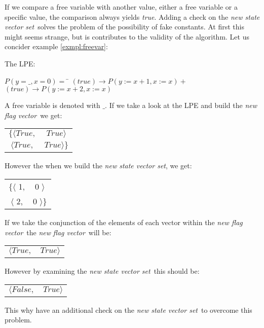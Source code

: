 \documentclass[a4paper,10pt]{article}
\theoremstyle{plain}
\theoremstyle{definition}
\newcommand{\ti}{\textit}
\newcommand{\fv}{\textit{flag vector}}
\newcommand{\svs}{\textit{new state vector set}}
\newcommand{\nfv}{\textit{new flag vector}}
\begin{document}
If we compare a free variable with another value, either a free variable or a specific value, the comparison always yields \ti{true}. Adding a check on the \svs\ solves the problem of the possibility of fake constants. At first this might seems strange, but is contributes to the validity of the algorithm. Let us concider example \ref{exmpl:freevar}:
\begin{example}\label{exmpl:freevar} The LPE: 
\begin{tabbing}
$P(y = \_,x = 0) =$ \= $(true) \rightarrow  P(y := x+1, x := x) + $ \\
	    \> $(true)
 \rightarrow P(y := x+2, x := x)$
\end{tabbing}

A free variable is denoted with $\_$. If we take a look at the LPE and build the \nfv\ we get:
\begin{center}
\begin{tabular}{cc} 
 $\lbrace \langle True, $ & $ True \rangle$\\
 $\langle True, $ & $ True \rangle \rbrace$\\
\end{tabular} 
\end{center}

However the when we build the \svs , we get:
\begin{center}
\begin{tabular}{cc} 
 $\lbrace \langle$ 1, & 0 $\rangle$\\
 $\langle$ 2, & 0 $\rangle \rbrace$\\
\end{tabular}  
\end{center}

If we take the conjunction of the elements of each vector within the \nfv\ the \ti{new} \fv\ will be:
\begin{center}
\begin{tabular}{cc} 
 $\langle True, $ & $ True \rangle$\\
\end{tabular}
\end{center}

However by examining the \svs\ this should be: 
\begin{center}
\begin{tabular}{cc} 
 $\langle False, $ & $ True \rangle$\\
\end{tabular}
\end{center}

This why have an additional check on the \svs\ to overcome this problem.
\end{example}
\end{document}
